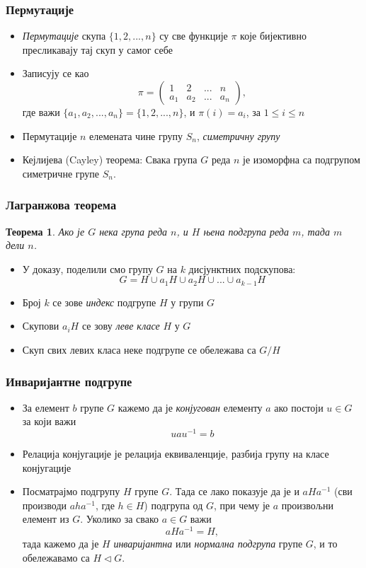 \documentclass{beamer}
\theoremstyle{plain}
\newtheorem{thm}{Теорема}
\theoremstyle{definition}
\begin{document}
\begin{frame}
\frametitle{Пермутације}
\begin{itemize}
  \item \emph{Пермутације} скупа $\{1, 2, ..., n\}$ су све функције $\pi$ које бијективно пресликавају тај скуп у самог себе
  \item Записују се као $$\pi = \begin{pmatrix}
            1 & 2 & ... & n \\
            a_1 & a_2 & ... & a_n
        \end{pmatrix},$$
 где важи $\{a_1, a_2, ..., a_n\} = \{1, 2, ..., n\}$, и $\pi(i) = a_i$, за $1\leq i\leq n$
  \item Пермутације $n$ елемената чине групу $S_n$, \emph{симетричну групу}
  \item Кејлијева (Cayley) теорема: Свака група $G$ реда $n$ је изоморфна са подгрупом симетричне групе $S_n$.
\end{itemize}
\end{frame}

\begin{frame}
\frametitle{Лагранжова теорема}
\begin{thm}
Ако је $G$ нека група реда $n$, и $H$ њена подгрупа реда $m$, тада $m$ дели $n$.
\end{thm}
\begin{itemize}
\item У доказу, поделили смо групу $G$ на $k$ дисјунктних подскупова:
$$G = H \cup a_1 H \cup a_2 H \cup ... \cup a_{k-1} H$$
\item Број $k$ се зове \emph{индекс} подгрупе $H$ у групи $G$
\item Скупови $a_i H$ се зову \emph{леве класе} $H$ у $G$
\item Скуп свих левих класа неке подгрупе се обележава са $G/H$
\end{itemize}
\end{frame}

\begin{frame}
\frametitle{Инваријантне подгрупе}
\begin{itemize}
\item За елемент $b$ групе $G$ кажемо да је \emph{конјугован} елементу $a$ ако постоји $u\in G$ за који важи
$$u a u^{-1} = b$$
\item Релација конјугације је релација еквиваленције, разбија групу на класе конјугације
\item Посматрајмо подгрупу $H$ групе $G$. Тада се лако показује да је и $aHa^{-1}$ (сви производи $aha^{-1}$, где $h\in H$) подгрупа од $G$, при чему је $a$ произвољни елемент из $G$. Уколико за свако $a\in G$ важи
$$aHa^{-1} = H,$$
тада кажемо да је $H$ \emph{инваријантна} или \emph{нормална подгрупа} групе $G$, и то обележавамо са $H\lhd G$.
\end{itemize}
\end{frame}
\end{document}
